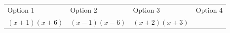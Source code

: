 {        \addtolength{\mytableboxheight}{\mytableboxdepth}
        \begin{center}
      \label{m39394*id276265}
    \noindent
      \tablelasttail{}
      \begin{xtabular*}{\mytablewidth}[t]{|p{10\mystarwidth}|p{10\mystarwidth}|p{10\mystarwidth}|p{10\mystarwidth}|}\hline
        Option 1 &
        Option 2 &
        Option 3 &
        Option 4%
     \tabularnewline{}
                $\left(x+1\right)\left(x+6\right)$
               &
                $\left(x-1\right)\left(x-6\right)$
               &
                $\left(x+2\right)\left(x+3\right)$
               &

\end{xtabular*}
\end{center}}
